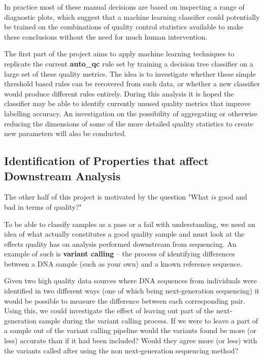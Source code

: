 In practice most of these manual decisions are based on inspecting a range of
diagnostic plots, which suggest that a machine learning classifier could
potentially be trained on the combinations of quality control statistics
available to make these conclusions without the need for much human
intervention.

The first part of the project aims to apply machine learning techniques to
replicate the current \textbf{auto\_qc} rule set by training a decision tree
classifier on a large set of these quality metrics. The idea is to investigate
whether these simple threshold based rules can be recovered from such data, or
whether a new classifier would produce different rules entirely. During this
analysis it is hoped the classifier may be able to identify currently unused
quality metrics that improve labelling accuracy. An investigation on the
possibility of aggregating or otherwise reducing the dimensions of some of the
more detailed quality statistics to create new parameters will also be
conducted.

\subsection{Identification of Properties that affect Downstream Analysis}
\label{sec:intro-part2}

The other half of this project is motivated by the question "What \textit{is}
good and bad in terms of quality?"

To be able to classify samples as a pass or a fail with understanding, we need
an idea of what actually constitutes a good quality sample and must look
at the effects quality has on analysis performed downstream from sequencing.
An example of such is \textbf{variant calling} -- the process of identifying
differences between a DNA sample (such as your own) and a known reference
sequence.

Given two high quality data sources where DNA sequences from individuals were
identified in two different ways (one of which being next-generation sequencing)
it would be possible to measure the difference between each corresponding pair.
Using this, we could investigate the effect of leaving out part of the
next-generation sample during the variant calling process.
If we were to leave a part of a sample out of the variant calling
pipeline would the variants found be more (or less) accurate than if it had been
included? Would they agree more (or less) with the variants called after using
the non next-generation sequencing method?

